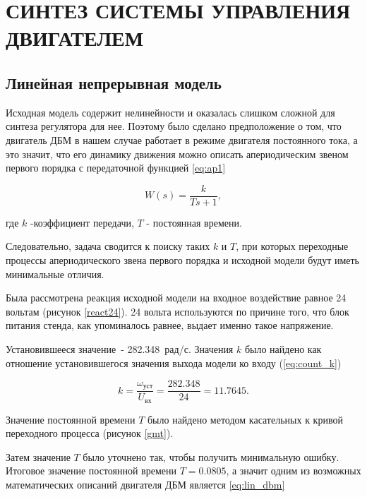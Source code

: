 \section{СИНТЕЗ СИСТЕМЫ УПРАВЛЕНИЯ ДВИГАТЕЛЕМ}

\subsection{Линейная непрерывная модель}

Исходная модель содержит нелинейности и оказалась слишком сложной для синтеза регулятора для нее.
Поэтому было сделано предположение о том, что двигатель ДБМ в нашем случае работает
в режиме двигателя постоянного тока, а это значит, что его динамику движения можно
описать апериодическим звеном первого порядка с передаточной функцией \ref{eq:ap1}

\begin{equation}
  W(s)=\frac{k}{Ts+1},
  \label{eq:ap1}
\end{equation}

где $k$ -коэффициент передачи, $T$ - постоянная времени.

Следовательно, задача сводится к поиску таких $k$ и $T$, при которых переходные процессы
апериодического звена первого порядка и исходной модели будут иметь минимальные отличия.

Была рассмотрена реакция исходной модели на входное воздействие равное 24 вольтам (рисунок \ref{react24}).
24 вольта используются по причине того, что блок питания стенда, как упоминалось равнее, выдает 
именно такое напряжение.


Установившееся значение~- 282.348~рад/с.
Значения $k$ было найдено как отношение установившегося значения выхода модели ко входу (\ref{eq:count_k})

\begin{equation}
  k = \frac{\omega_{\text{уст}}}{U_{\text{вх}}} = \frac{282.348}{24} = 11.7645.
  \label{eq:count_k}
\end{equation}

Значение постоянной времени $T$ было найдено методом касательных к кривой переходного
процесса (рисунок \ref{gmt}).


Затем значение $T$ было уточнено так, чтобы получить минимальную ошибку.
Итоговое значение постоянной времени $T = 0.0805$, а значит одним из возможных
математических описаний двигателя ДБМ является \ref{eq:lin_dbm}

